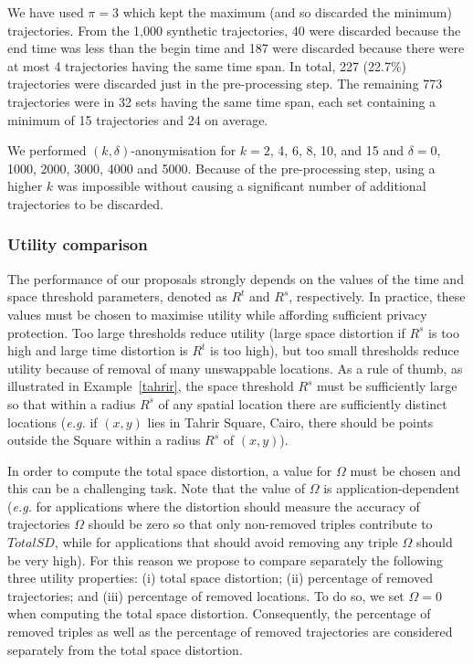 We have used $\pi = 3$ which kept the maximum (and so discarded the minimum)
trajectories. From the 1,000 synthetic trajectories, 40 were discarded because
the end time was less than the begin time and 187 were discarded because
there were at most 4 trajectories having the same time span. In total, 227
(22.7\%) trajectories were discarded just in the pre-processing step. The
remaining 773 trajectories were in 32 sets having the same time span, each
set containing a minimum of 15 trajectories and 24 on average.

We performed $(k, \delta)$-anonymisation for $k = 2$, 4, 6, 8, 10, and
15 and $\delta = 0$, 1000, 2000, 3000, 4000 and 5000. Because of the
pre-processing step, using a higher $k$ was impossible without
causing a
significant number of additional trajectories to be discarded.


\subsubsection{Utility comparison}

The performance of our proposals strongly depends on the values
of the time and space threshold parameters, denoted as $R^t$
and $R^s$, respectively. In practice, these values must be chosen
to maximise utility
while affording sufficient privacy protection. Too large
thresholds reduce utility (large space distortion if $R^s$ is too
high and large time distortion is $R^t$ is too high),
but too small thresholds
reduce utility because of removal of many unswappable locations.
As a rule of thumb, as illustrated in Example~\ref{tahrir},
the space threshold $R^s$ must be sufficiently large so that
within a radius $R^s$ of any spatial location
there are sufficiently distinct locations ({\em e.g.}
if $(x,y)$ lies in Tahrir Square, Cairo, there should
be points outside the Square within a radius $R^s$ of $(x,y)$).

In order to compute the total space distortion, a value
for $\Omega$ must be chosen and this can be a challenging task.
Note that the value of $\Omega$ is application-dependent
({\em e.g.} for applications where the distortion should
measure the accuracy of trajectories
$\Omega$ should be zero so that only non-removed triples
contribute to $TotalSD$, while for
applications that should avoid removing any triple
$\Omega$ should be very high).
For this reason we propose to compare separately the following three utility
properties: (i) total space distortion; (ii) percentage
of removed trajectories; and
(iii) percentage of removed locations. To do so, we set $\Omega = 0$
when computing the total space distortion. Consequently, the
percentage of removed triples as well as the percentage of removed
trajectories are considered separately from the total space distortion.


